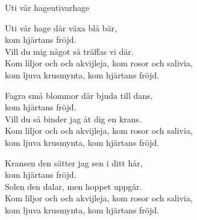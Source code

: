\begin{song}{Uti vår hage}{utivarhage}
\vspace{0.5cm}
\begin{vers}
Uti vår hage där växa blå bär,\\
kom hjärtans fröjd.\\
Vill du mig något så träffas vi där.\\
Kom liljor och och akvijleja, kom rosor och salivia,\\
kom ljuva krusmynta, kom hjärtans fröjd.\\
\end{vers}
\begin{vers}
Fagra små blommor där bjuda till dans,\\
kom hjärtans fröjd.\\
Vill du så binder jag åt dig en krans.\\
Kom liljor och och akvijleja, kom rosor och salivia,\\
kom ljuva krusmynta, kom hjärtans fröjd.\\
\end{vers}
\begin{vers}
Kransen den sätter jag sen i ditt hår,\\
kom hjärtans fröjd.\\
Solen den dalar, men hoppet uppgår.\\
Kom liljor och och akvijleja, kom rosor och salivia,\\
kom ljuva krusmynta, kom hjärtans fröjd.\\
\end{vers}
\end{song}
